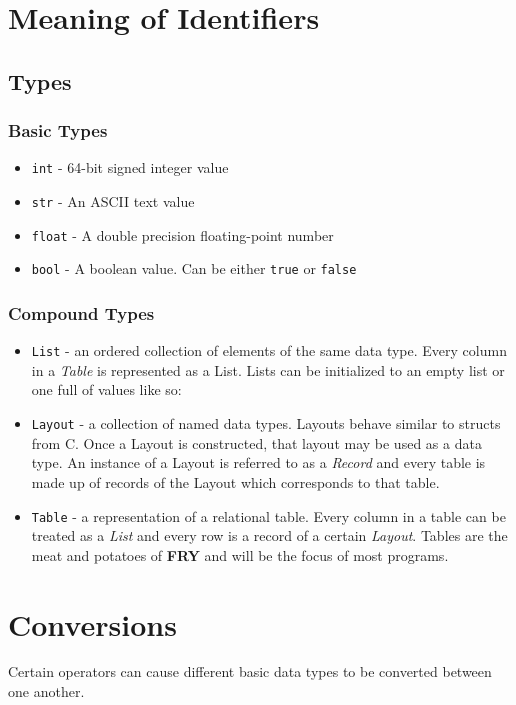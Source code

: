 \documentclass{article}
\begin{document}
\section{Meaning of Identifiers}
\subsection{Types}
\label{sec:types}
\subsubsection{Basic Types}
\label{sec:prims}
\begin{itemize}
\item \texttt{int} - 64-bit signed integer value
\item \texttt{str} - An ASCII text value
\item \texttt{float} - A double precision floating-point number
\item \texttt{bool} - A boolean value. Can be either \texttt{true} or \texttt{false}
\end{itemize}

\subsubsection{Compound Types}

\begin{itemize} 

\item \texttt{List} - an ordered collection of elements of the same data type. Every column in a \emph{Table} is represented as a List. Lists can be initialized to an empty list or one full of values like so:

\item \texttt{Layout} - a collection of named data types. Layouts behave similar to structs from C. Once a Layout is constructed, that layout may be used as a data type.  An instance of a Layout is referred to as a \emph{Record} and every table is made up of records of the Layout which corresponds to that table.

\item \texttt{Table} - a representation of a relational table. Every column in a table can be treated as a \emph{List} and every row is a record of a certain \emph{Layout}. Tables are the meat and potatoes of \textbf{FRY} and will be the focus of most programs.

\end{itemize}

\section{Conversions}
Certain operators can cause different basic data types to be converted between one another.
\end{document}

